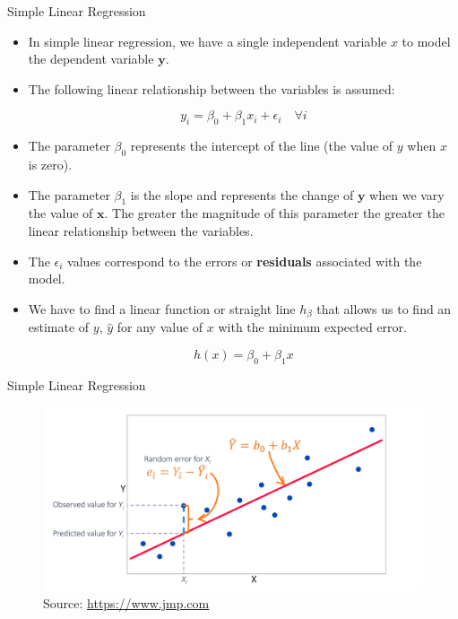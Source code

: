 \documentclass[handout]{beamer}
\begin{document}
\begin{frame}{Simple Linear Regression}
\scriptsize{
\begin{itemize}
 \item In simple linear regression, we have a single independent variable $x$ to model the dependent variable $\mathbf{y}$.

 \item The following linear relationship between the variables is assumed:

\begin{displaymath}
 y_i=\beta_{0}+\beta_{1}x_i +\epsilon_i \quad \forall i
\end{displaymath}

\item The parameter $\beta_{0}$ represents the intercept of the line (the value of $y$ when $x$ is zero).  

\item The parameter $\beta_{1}$ is the slope and represents the change of $\mathbf{y}$ when we vary the value of $\mathbf{x}$. The greater the magnitude of this parameter the greater the linear relationship between the variables.

\item The $\epsilon_{i}$ values correspond to the errors or \textbf{residuals} associated with the model.

\item We have to find a linear function or straight line $h_\beta$ that allows us to find an estimate of $y$, $\hat{y}$ for any value of $x$ with the minimum expected error.

\begin{displaymath}
h(x)=\beta_{0}+\beta_{1}x 
\end{displaymath}


\end{itemize}


} 
 
\end{frame}



\begin{frame}{Simple Linear Regression}
\scriptsize{

\begin{figure}[h!]
  \centering
  \includegraphics[scale=0.21]{pics/linear_model.png}
  \caption{Source: \url{https://www.jmp.com}}
\end{figure}

} 
 
\end{frame}
\end{document}
